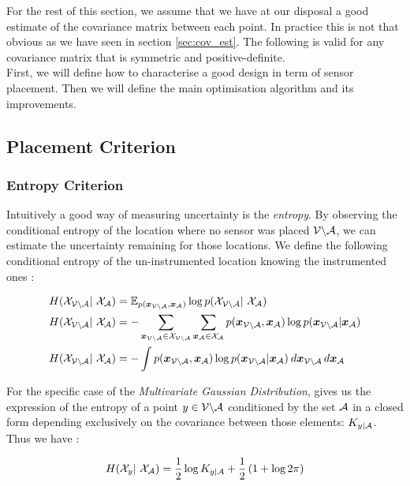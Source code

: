 For the rest of this section, we assume that we have at our disposal a good estimate of the covariance matrix between each point. In practice this is not that obvious as we have seen in section \ref{sec:cov_est}. The following is valid for any covariance matrix that is symmetric and positive-definite. \\ 

First, we will define how to characterise a good design in term of sensor placement. Then we will define the main optimisation algorithm and its improvements. \\ 

\subsection{Placement Criterion}

\subsubsection{Entropy Criterion}

Intuitively a good way of measuring uncertainty is the \textit{entropy}. By observing the conditional entropy of the location where no sensor was placed $\mathcal{V} \backslash\mathcal{A}$, we can estimate the uncertainty remaining for those locations. We define the following conditional entropy of the un-instrumented location knowing the instrumented ones \citep[p.~16]{cover_elements_1991} :

\begin{align}
    H(\X_{\VA} | \X_\A) &= \mathbb{E}_{p(\vec{x}_{\VA},\vec{x}_\A)} \log p(\X_{\VA} | \X_\A) \\
    H(\X_{\VA} | \X_\A) &= - \sum_{\vec{x}_{\VA} \in \X_{\VA}}\sum_{\vec{x}_{\A} \in \X_{\A}} p(\vec{x}_{\VA},\vec{x}_\A) \log p(\vec{x}_{\VA}|\vec{x}_\A) \\
    H(\X_{\VA} | \X_\A) &= - \int p(\vec{x}_{\VA},\vec{x}_\A) \log p(\vec{x}_{\VA}|\vec{x}_\A) \: d\vec{x}_{\VA} \, d\vec{x}_\A 
\end{align}

For the specific case of the \textit{Multivariate Gaussian Distribution}, \citet{krause_near-optimal_2008} gives us the expression of the entropy of a point $y \in \mathcal{V} \backslash\mathcal{A}$ conditioned by the set $\mathcal{A}$ in a closed form depending exclusively on the covariance between those elements: $K_{y | \mathcal{A}}$. Thus we have :  

\begin{equation}
    H(\X_{y} | \X_\A) = \frac{1}{2} \log K_{y | \A} + \frac{1}{2} \left(1 + \log 2\pi  \right) \label{equ:entGP}
\end{equation}

